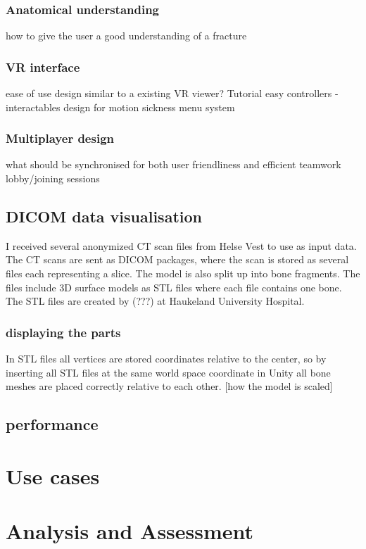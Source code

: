 \documentclass[a4paper]{report}
\begin{document}
\subsection{Anatomical understanding}
how to give the user a good understanding of a fracture

\subsection{VR interface}
ease of use
design similar to a existing VR viewer?
Tutorial
easy controllers
-interactables
design for motion sickness
menu system

\subsection{Multiplayer design}
what should be synchronised for both user friendliness and efficient teamwork
lobby/joining sessions

\section{DICOM data visualisation}
I received several anonymized CT scan files from Helse Vest to use as input data. The CT scans are sent as DICOM packages\cite{dicom}, where the scan is stored as several files each representing a slice. 
The model is also split up into bone fragments. The files include 3D surface models as STL files where each file contains one bone. The STL files are created by (???) at Haukeland University Hospital.
\subsection{displaying the parts}
In STL files all vertices are stored coordinates relative to the center, so by inserting all STL files at the same world space coordinate in Unity all bone meshes are placed correctly relative to each other. [how the model is scaled]


\section{performance}

\chapter{Use cases}\label{UseCases}

\chapter{Analysis and Assessment}\label{Analysis and Assessment}
\end{document}
